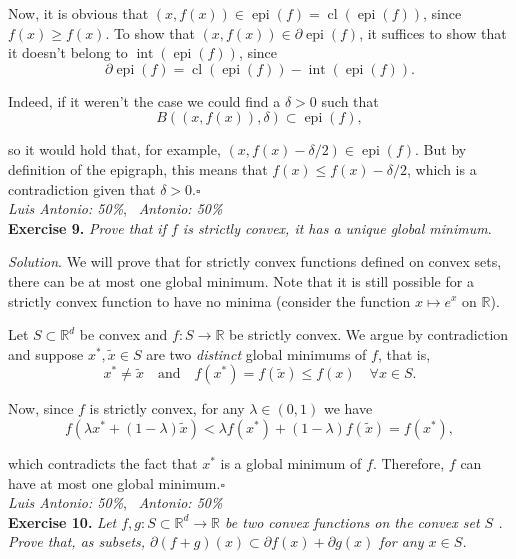 \documentclass[12pt]{article}
\newcommand*{\QED}{\null\nobreak\hfill\ensuremath{\square}}%
\begin{document}
Now, it is obvious that $(x, f(x))\in \operatorname{epi}(f)=\operatorname{cl}(\operatorname{epi}(f) )$, since $f(x)\geq f(x)$. To show that $(x, f(x))\in \partial \operatorname{epi}(f)$, it suffices to show that it doesn't belong to $\operatorname{int}(\operatorname{epi}(f))$, since
\[
\partial \operatorname{epi}(f) =\operatorname{cl}(\operatorname{epi}(f) ) - \operatorname{int}(\operatorname{epi}(f)).
\]

Indeed, if it weren't the case we could find a $\delta > 0$ such that
\[
B((x, f(x)), \delta) \subset \operatorname{epi}(f),
\]

so it would hold that, for example, $(x, f(x)-\delta/2) \in \operatorname{epi}(f)$. But by definition of the epigraph, this means that $f(x)\leq f(x) - \delta/2$, which is a contradiction given that $\delta>0$.\QED\\



\textit{Luis Antonio: 50\%}, \ \textit{Antonio: 50\%}\\
\textbf{Exercise 9. }\emph{Prove that if \( f \)  is strictly convex, it has a unique global minimum}.

\emph{Solution}. We will prove that for strictly convex functions defined on convex sets, there can be at most one global minimum. Note that it is still possible for a strictly convex function to have no minima (consider the function $x\mapsto e^x$ on $\mathbb R$).

Let $S\subset \mathbb R^d$ be convex and $f:S \to \mathbb R$ be strictly convex. We argue by contradiction and suppose $x^*, \tilde x \in S$ are two \textit{distinct} global minimums of $f$, that is,
\[
x^\ast \neq \tilde x \quad \text{and} \quad f(x^*)=f(\tilde x) \leq f(x) \quad \forall x \in S.
\]

Now, since $f$ is strictly convex, for any $\lambda \in (0,1)$ we have
\[
f(\lambda x^* + (1-\lambda)\tilde x) < \lambda f(x^*) + (1-\lambda)f(\tilde x) = f(x^\ast),
\]

which contradicts the fact that $x^*$ is a global minimum of $f$. Therefore, $f$ can have at most one global minimum.\QED\\

\textit{Luis Antonio: 50\%}, \ \textit{Antonio: 50\%}\\
\textbf{Exercise 10. }\emph{Let \( f,g: S \subset \mathbb{R}^d \to \mathbb{R} \)  be two convex functions on the convex set \( S \) . Prove that, as subsets, \( \partial(f+g)(x) \subset \partial f(x) + \partial g(x) \) for any $x\in S$. }
\end{document}
